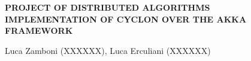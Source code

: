\begin{center} {
	\bfseries\Large {PROJECT OF DISTRIBUTED ALGORITHMS } \\
	\vspace{0.1cm}
	\bfseries \large {IMPLEMENTATION OF CYCLON OVER THE AKKA FRAMEWORK} } \\
\end{center}
\begin{flushleft}
	Luca Zamboni (XXXXXX), Luca Erculiani (XXXXXX)
		
\end{flushleft}
